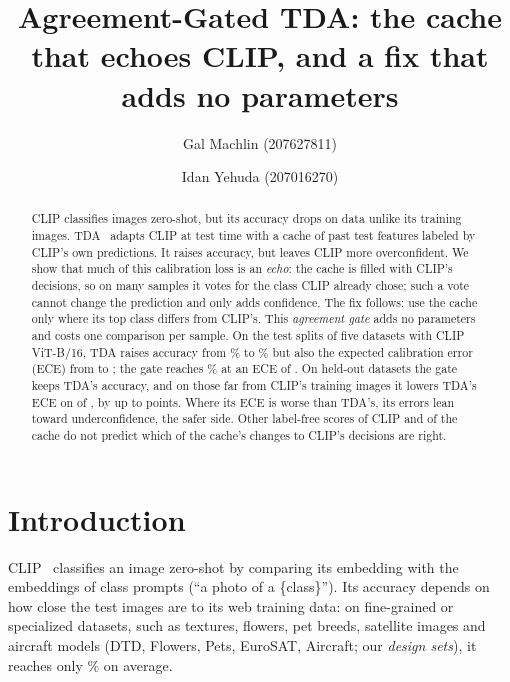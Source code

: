 \documentclass[10pt]{article}
\title{Agreement-Gated TDA: the cache that echoes CLIP, and a fix that adds no parameters}
\author{Gal Machlin (207627811) \and Idan Yehuda (207016270)}
\date{}
\begin{document}
\maketitle

\begin{abstract}
CLIP classifies images zero-shot, but its accuracy drops on data unlike its training images. TDA~\cite{karmanov2024tda}
adapts CLIP at test time with a cache of past test features labeled by CLIP's own predictions. It raises accuracy, but
leaves CLIP more overconfident. We show that much of this calibration loss is an \emph{echo}: the cache is filled with
CLIP's decisions, so on many samples it votes for the class CLIP already chose; such a vote cannot change the prediction
and only adds confidence. The fix follows: use the cache only where its top class differs from CLIP's. This
\emph{agreement gate} adds no parameters and costs one comparison per sample. On the test splits of five datasets with
CLIP ViT-B/16, TDA raises accuracy from \mainClipAcc\% to \mainTdaAcc\% but also the expected calibration error (ECE)
from \mainClipEce{} to \mainTdaEce; the gate reaches \mainGateAcc\% at an ECE of \mainGateEce. On \genAllN{} held-out
datasets the gate keeps TDA's accuracy, and on those far from CLIP's training images it lowers TDA's ECE on
\genFarEceWins{} of \genFarN, by up to \farBigHi{} points. Where its ECE is worse than TDA's, its errors lean toward
underconfidence, the safer side. Other label-free scores of CLIP and of the cache do not predict which of the cache's
changes to CLIP's decisions are right.
\end{abstract}

\section{Introduction}
CLIP~\cite{radford2021clip} classifies an image zero-shot by comparing its embedding with the embeddings of class
prompts (``a photo of a \{class\}''). Its accuracy depends on how close the test images are to its web training data:
on fine-grained or specialized datasets, such as textures, flowers, pet breeds, satellite images and aircraft models
(DTD, Flowers, Pets, EuroSAT, Aircraft; our \emph{design sets}), it reaches only \mainClipAcc\% on average.
\end{document}

